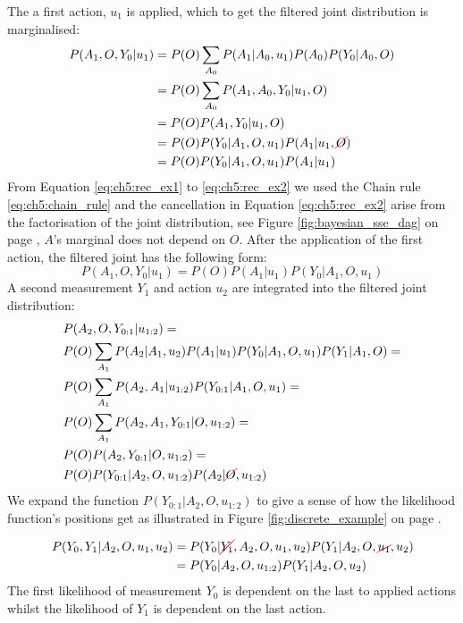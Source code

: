 The a first action, $u_1$ is applied, which to get the filtered joint distribution is marginalised:
\begin{align}
  P(A_1,O,Y_0|u_1) &= P(O)\sum\limits_{A_0} P(A_1|A_0,u_1) P(A_0) P(Y_0|A_0,O)\\
                   &= P(O)\sum\limits_{A_0} P(A_1,A_0,Y_0|u_1,O)\\
                   &= P(O) P(A_1,Y_0|u_1,O) \label{eq:ch5:rec_ex1}\\
                   &= P(O) P(Y_0|A_1,O,u_1) P(A_1|u_1,\Ccancel[red]{O}) \label{eq:ch5:rec_ex2}\\
                   &= P(O) P(Y_0|A_1,O,u_1) P(A_1|u_1) 
\end{align} 
From Equation \ref{eq:ch5:rec_ex1} to \ref{eq:ch5:rec_ex2} we used the Chain rule \ref{eq:ch5:chain_rule} and 
the cancellation in Equation \ref{eq:ch5:rec_ex2} arise from the factorisation of the joint distribution, 
see Figure \ref{fig:bayesian_sse_dag} on page \pageref{fig:bayesian_sse_dag}, $A$'s marginal does not depend on $O$.
After the application of the first action, the filtered joint has the following form:
\begin{equation}
 P(A_1,O,Y_0|u_1) = P(O) P(A_1|u_1) P(Y_0|A_1,O,u_1)
\end{equation}
A second measurement $Y_1$ and action $u_2$ are integrated into the filtered joint distribution:
\begin{align}
 &P(A_2,O,Y_{0:1}|u_{1:2}) = \nonumber \\
 &P(O) \sum\limits_{A_1} P(A_2|A_1,u_2) P(A_1|u_1) P(Y_0|A_1,O,u_1) P(Y_1|A_1,O) = \nonumber\\
 &P(O) \sum\limits_{A_1} P(A_2,A_1|u_{1:2}) P(Y_{0:1}|A_1,O,u_1) = \nonumber \\
 &P(O) \sum\limits_{A_1} P(A_2,A_1,Y_{0:1}|O,u_{1:2}) = \nonumber \\
 &P(O) P(A_2,Y_{0:1}|O,u_{1:2}) = \\
 &P(O) P(Y_{0:1}|A_2,O,u_{1:2})P(A_2|\Ccancel[red]{O},u_{1:2}) \label{eq:ch5:rec_ex3} 
\end{align}
We expand the function $P(Y_{0:1}|A_2,O,u_{1:2})$ to give a sense of how the likelihood function's positions 
get as illustrated in Figure \ref{fig:discrete_example} on page \pageref{fig:discrete_example}.

\begin{align}
  P(Y_0,Y_1|A_2,O,u_1,u_2) &= P(Y_0|\Ccancel[red]{Y_1},A_2,O,u_1,u_2) P(Y_1|A_2,O,\Ccancel[red]{u_1},u_2) \\
		           &= P(Y_0|A_2,O,u_{1:2}) P(Y_1|A_2,O,u_2)
\end{align}
The first likelihood of measurement $Y_0$ is dependent on the last to applied actions whilst the likelihood
of $Y_1$ is dependent on the last action.
 
